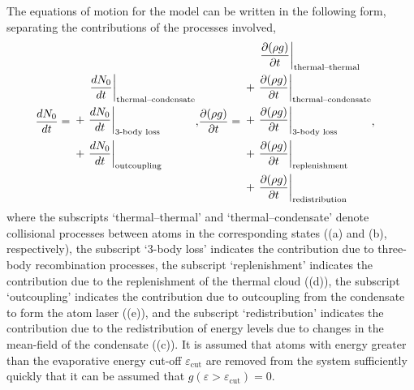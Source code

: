 The equations of motion for the model can be written in the following form, separating the contributions of the processes involved,
\begin{align}
    \frac{d N_0}{d t} =\begin{split}
        &\relphantom{+}\left. \frac{d N_0}{d t}\right|_\text{thermal--condensate} \\
        &+\left. \frac{d N_0}{d t}\right|_\text{3-body loss} \\
        &+\left. \frac{d N_0}{d t}\right|_\text{outcoupling}
    \end{split},
    & \frac{\partial (\rho g)}{\partial t} = \begin{split}
        &\relphantom{+}\left. \frac{\partial (\rho g)}{\partial t}\right|_\text{thermal--thermal} \\
        &+\left. \frac{\partial (\rho g)}{\partial t}\right|_\text{thermal--condensate} \\
        &+\left. \frac{\partial (\rho g)}{\partial t}\right|_\text{3-body loss} \\
        &+\left. \frac{\partial (\rho g)}{\partial t}\right|_\text{replenishment} \\
        &+\left. \frac{\partial (\rho g)}{\partial t}\right|_\text{redistribution}
    \end{split},
    \label{KineticTheory:EvolutionEquations}
\end{align}
where the subscripts `thermal--thermal' and `thermal--condensate' denote collisional processes between atoms in the corresponding states ((a) and (b), respectively), the subscript `3-body loss' indicates the contribution due to three-body recombination processes, the subscript `replenishment' indicates the contribution due to the replenishment of the thermal cloud ((d)), the subscript `outcoupling' indicates the contribution due to outcoupling from the condensate to form the atom laser ((e)), and the subscript `redistribution' indicates the contribution due to the redistribution of energy levels due to changes in the mean-field of the condensate ((c)). It is assumed that atoms with energy greater than the evaporative energy cut-off $\varepsilon_\text{cut}$ are removed from the system sufficiently quickly that it can be assumed that $g(\varepsilon > \varepsilon_\text{cut}) = 0$.

